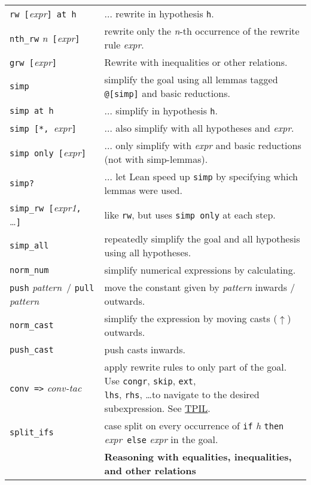 \documentclass[a4paper]{article}
\newcommand{\lean}[1]{{\tt #1}}
\newcommand{\expr}[1][]{\textit{expr#1}\xspace}
\newcommand{\pattern}{\textit{pattern}\xspace}
\newcommand{\nat}{\textit{n}\xspace}
\begin{document}
\begin{center}
\begin{longtable}{@{}lp{113mm}@{}}
  \lean{rw [}\expr\lean{] at h} & $\ldots$ rewrite in hypothesis \lean{h}. \\
  \lean{nth\_rw} \nat\ \lean{[}\expr\lean{]} & rewrite only the \nat-th occurrence of the rewrite rule \expr.\\
  \lean{grw [}\expr\lean{]} & Rewrite with inequalities or other relations. \\
  \lean{simp} & simplify the goal using all lemmas tagged \lean{@[simp]} and basic reductions. \\
  \lean{simp at h} & $\ldots$ simplify in hypothesis \lean{h}. \\
  \lean{simp [*, }\expr\lean{]} & $\ldots$ also simplify with all hypotheses and \expr. \\
  \lean{simp only [}\expr\lean{]}& $\ldots$ only simplify with \expr and basic reductions (not with simp-lemmas). \\
  \lean{simp?}& $\ldots$ let Lean speed up \lean{simp} by specifying which lemmas were used. \\
  \lean{simp\_rw [}\expr[1]\lean{, }\ldots\lean{]} & like \lean{rw}, but uses \lean{simp only} at each step. \\
  \lean{simp\_all} & repeatedly simplify the goal and all hypothesis using all hypotheses.\\
  \lean{norm\_num} & simplify numerical expressions by calculating. \\
  \lean{push} \pattern\ / \lean{pull} \pattern & move the constant given by \pattern inwards / outwards.\\
  \lean{norm\_cast} & simplify the expression by moving casts ($\uparrow$) outwards.\\
  \lean{push\_cast} & push casts inwards.\\
  \lean{conv =>} \textit{conv-tac} &
    \makecell[lt]{apply rewrite rules to only part of the goal.
    Use \lean{congr}, \lean{skip}, \lean{ext}, \\ \lean{lhs}, \lean{rhs}, \ldots to navigate to the desired subexpression.
    See \href{https://docs.lean-lang.org/theorem_proving_in_lean4/conv.html}{TPIL}.}\\
  \lean{split\_ifs} & case split on every occurrence of \lean{if} \textit{h} \lean{then} \expr\ \lean{else} \expr in the goal. \\
    \hline
  &\textbf{Reasoning with equalities, inequalities, and other relations}\\

\end{longtable}
\end{center}
\end{document}
